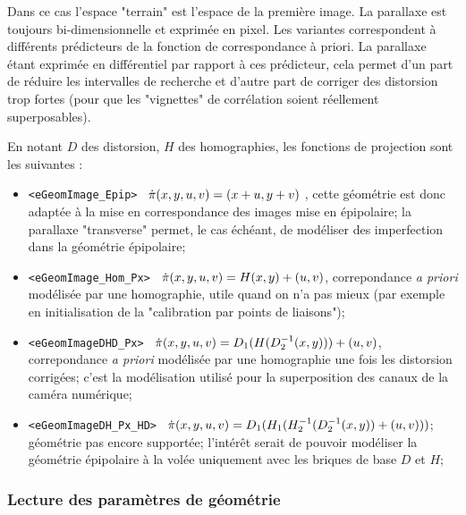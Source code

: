 Dans ce cas l'espace "terrain" est l'espace de la premi\`ere image.
La parallaxe est toujours bi-dimensionnelle et exprim\'ee en pixel.
Les variantes correspondent  \`a diff\'erents pr\'edicteurs de la
fonction de correspondance \`a priori. La parallaxe \'etant exprim\'ee
en diff\'erentiel par rapport \`a ces pr\'edicteur, cela permet
d'un part de r\'eduire les intervalles de recherche et d'autre part
de corriger des distorsion trop fortes (pour  que les "vignettes" 
de corr\'elation soient r\'eellement superposables).

En notant $D$ des distorsion, $H$ des homographies, 
les fonctions de projection sont les suivantes :


\begin{itemize}
   \item     {\tt   <eGeomImage\_Epip>     }  $\PiI(x,y,u,v) = (x+u,y+v)$ ,
             cette g\'eom\'etrie est donc adapt\'ee \`a la mise en 
             correspondance des images mise en \'epipolaire;
             la parallaxe "transverse" permet, le cas \'ech\'eant,
             de mod\'eliser des imperfection
             dans la g\'eom\'etrie \'epipolaire;

   \item {\tt   <eGeomImage\_Hom\_Px>  }
              $\PiI(x,y,u,v) = H(x,y) +(u,v)$,
              correpondance \emph{a priori} mod\'elis\'ee par une homographie,
              utile  quand on n'a pas mieux (par exemple en  initialisation
              de la "calibration par points de liaisons");

   \item     {\tt   <eGeomImageDHD\_Px>    }
              $\PiI(x,y,u,v) = D_1(H(D^{-1}_2(x,y))) +(u,v)$,
              correpondance \emph{a priori} mod\'elis\'ee par une homographie
              une fois les distorsion corrig\'ees; c'est la mod\'elisation
              utilis\'e pour la
              superposition des canaux de la cam\'era num\'erique;


   \item {\tt   <eGeomImageDH\_Px\_HD> } 
              $\PiI(x,y,u,v) = D_1(H_1 (H^{-1}_2(D^{-1}_2(x,y)) +(u,v)))$;
              g\'eom\'etrie pas encore support\'ee; l'int\'er\^et serait
              de pouvoir mod\'eliser la g\'eom\'etrie \'epipolaire \`a la
              vol\'ee uniquement avec les briques de base  $D$ et $H$;

\end{itemize}


\subsubsection{Lecture des  param\`etres de g\'eom\'etrie}

